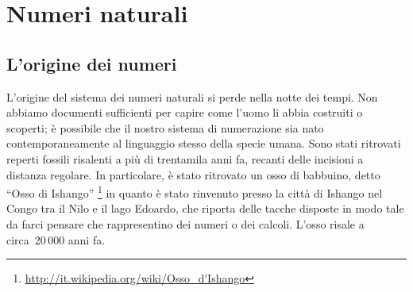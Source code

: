 


\chapter{Numeri naturali}


\section{L'origine dei numeri}
\label{sec:nat_origine}

L'origine del sistema dei numeri naturali si perde nella notte dei tempi. 
Non abbiamo documenti sufficienti per capire come l'uomo li abbia 
costruiti o scoperti; è possibile che il nostro sistema di numerazione 
sia nato contemporaneamente al linguaggio stesso della specie umana. 
Sono stati ritrovati reperti fossili risalenti a più di trentamila
anni fa, recanti delle incisioni a distanza regolare. 
In particolare, è stato ritrovato un osso di babbuino, 
detto ``Osso di Ishango''
\footnote{\url{http://it.wikipedia.org/wiki/Osso_d'Ishango}} 
in quanto è stato rinvenuto presso la città di Ishango nel Congo tra il 
Nilo e il lago Edoardo, che riporta delle tacche disposte in modo tale da 
farci pensare che rappresentino dei numeri o dei calcoli. 
L'osso risale a circa~20\,000 anni fa.

